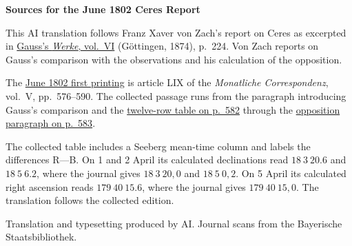 \clearpage\thispagestyle{empty}
\begin{center}\textbf{Sources for the June 1802 Ceres Report}\end{center}
\noindent This AI translation follows Franz Xaver von Zach’s report on Ceres as excerpted in \href{https://gdz.sub.uni-goettingen.de/id/PPN236007467}{Gauss’s \textit{Werke}, vol.~VI} (Göttingen, 1874), p.~224. Von Zach reports on Gauss’s comparison with the observations and his calculation of the opposition.
\par\smallskip\noindent The \href{https://api.digitale-sammlungen.de/iiif/image/v2/bsb10538597_00592/full/1450,/0/default.jpg}{June 1802 first printing} is article LIX of the \textit{Monatliche Correspondenz}, vol.~V, pp.~576--590. The collected passage runs from the paragraph introducing Gauss’s comparison and the \href{https://api.digitale-sammlungen.de/iiif/image/v2/bsb10538597_00598/full/1450,/0/default.jpg}{twelve-row table on p.~582} through the \href{https://api.digitale-sammlungen.de/iiif/image/v2/bsb10538597_00599/full/1450,/0/default.jpg}{opposition paragraph on p.~583}.
\par\smallskip\noindent The collected table includes a Seeberg mean-time column and labels the differences R—B. On 1 and 2 April its calculated declinations read \(18\ 3\ 20.6\) and \(18\ 5\ 6.2\), where the journal gives \(18\ 3\ 20{,}0\) and \(18\ 5\ 0{,}2\). On 5 April its calculated right ascension reads \(179\ 40\ 15.6\), where the journal gives \(179\ 40\ 15{,}0\). The translation follows the collected edition.
\par\smallskip\noindent Translation and typesetting produced by AI. Journal scans from the Bayerische Staatsbibliothek.
\clearpage
